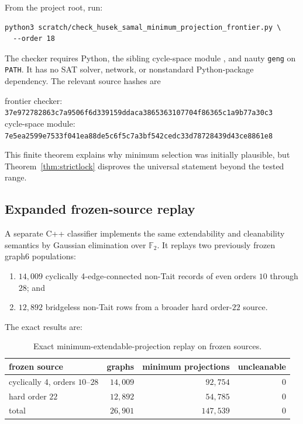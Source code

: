 \documentclass[11pt]{article}
\theoremstyle{definition}
\theoremstyle{remark}
\newcommand{\F}{\mathbb F}
\begin{document}
From the project root, run:
\begin{verbatim}
python3 scratch/check_husek_samal_minimum_projection_frontier.py \
  --order 18
\end{verbatim}
The checker requires Python, the sibling cycle-space module
, and
nauty \texttt{geng} on \texttt{PATH}.  It has no SAT solver, network, or
nonstandard Python-package dependency.  The relevant source hashes are
\begin{center}
\small
frontier checker:\\
\texttt{37e972782863c7a9506f6d339159ddaca3865363107704f86365c1a9b77a30c3}\\[2pt]
cycle-space module:\\
\texttt{7e5ea2599e7533f041ea88de5c6f5c7a3bf542cedc33d78728439d43ce8861e8}
\end{center}

This finite theorem explains why minimum selection was initially
plausible, but Theorem~\ref{thm:strictlock} disproves the universal
statement beyond the tested range.

\subsection{Expanded frozen-source replay}

A separate C++ classifier implements the same extendability and
cleanability semantics by Gaussian elimination over \(\F_2\).  It replays
two previously frozen graph6 populations:
\begin{enumerate}
  \item \(14{,}009\) cyclically 4-edge-connected non-Tait records of even
        orders \(10\) through \(28\); and
  \item \(12{,}892\) bridgeless non-Tait rows from a broader hard
        order-\(22\) source.
\end{enumerate}
The exact results are:
\begin{table}[h]
\centering
\begin{tabular}{lrrr}
\toprule
frozen source & graphs & minimum projections & uncleanable\\
\midrule
cyclically 4, orders \(10\)--\(28\) & \(14{,}009\) & \(92{,}754\) & \(0\)\\
hard order \(22\) & \(12{,}892\) & \(54{,}785\) & \(0\)\\
\midrule
total & \(26{,}901\) & \(147{,}539\) & \(0\)\\
\bottomrule
\end{tabular}
\caption{Exact minimum-extendable-projection replay on frozen sources.}
\end{table}
\end{document}
